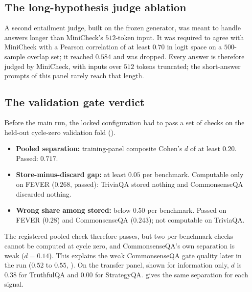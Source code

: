 \FloatBarrier

\subsection{The long-hypothesis judge ablation}
\label{sec:adj-judge-ablation}

A second entailment judge, built on the frozen generator, was meant to handle answers longer than MiniCheck's $512$-token input. It was required to agree with MiniCheck with a Pearson correlation of at least $0.70$ in logit space on a $500$-sample overlap set; it reached $0.584$ and was dropped. Every answer is therefore judged by MiniCheck, with inputs over $512$ tokens truncated; the short-answer prompts of this panel rarely reach that length.

\subsection{The validation gate verdict}
\label{sec:adj-gate}

Before the main run, the locked configuration had to pass a set of checks on the held-out cycle-zero validation fold ().
\begin{itemize}
    \item \textbf{Pooled separation:} training-panel composite Cohen's $d$ of at least $0.20$. Passed: $0.717$.
    \item \textbf{Store-minus-discard gap:} at least $0.05$ per benchmark. Computable only on FEVER ($0.268$, passed): TriviaQA stored nothing and CommonsenseQA discarded nothing.
    \item \textbf{Wrong share among stored:} below $0.50$ per benchmark. Passed on FEVER ($0.28$) and CommonsenseQA ($0.243$); not computable on TriviaQA.
\end{itemize}
The registered pooled check therefore passes, but two per-benchmark checks cannot be computed at cycle zero, and CommonsenseQA's own separation is weak ($d = 0.14$). This explains the weak CommonsenseQA gate quality later in the run ($0.52$ to $0.55$, ). On the transfer panel, shown for information only, $d$ is $0.38$ for TruthfulQA and $0.00$ for StrategyQA.  gives the same separation for each signal.





\FloatBarrier

